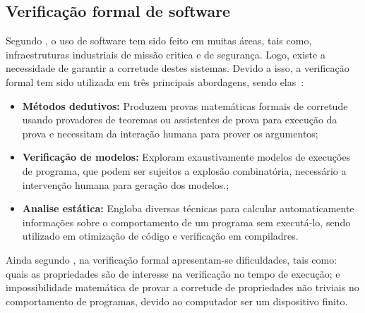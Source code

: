 \subsection{Verificação formal de software}

Segundo \citeauthor{rocha2015verificaccao}, o uso de software tem sido feito em muitas áreas, tais como, infraestruturas industriais de missão critica e de segurança.  Logo, existe a necessidade de garantir a corretude destes sistemas. Devido a isso, a verificação formal tem sido utilizada em três principais abordagens, sendo elas~\cite{cousot2010gentle,d2008survey}:
\begin{itemize}
 \item \textbf{Métodos dedutivos:} Produzem provas matemáticas formais de corretude usando provadores de teoremas ou assistentes de prova para execução da prova e necessitam da interação humana para prover os argumentos\cite{cousot2010gentle};
  \item \textbf{Verificação de modelos:} Exploram exaustivamente modelos de execuções de programa, que podem ser sujeitos a explosão combinatória, necessário a intervenção humana para geração dos modelos.\cite{rocha2015verificaccao};
  \item \textbf{Analise estática:} Engloba diversas técnicas para calcular automaticamente informações sobre o comportamento de um programa sem executá-lo, sendo utilizado em otimização de código e verificação em compiladres\cite{d2008survey}.
\end{itemize}

Ainda segundo \citeauthor{rocha2015verificaccao}, na verificação formal apresentam-se dificuldades, tais como: quais as propriedades são de interesse na verificação no tempo de execução; e impossibilidade matemática de provar a corretude de propriedades não triviais no comportamento de programas, devido ao computador ser um dispositivo finito\cite{cousot2010gentle}. 

